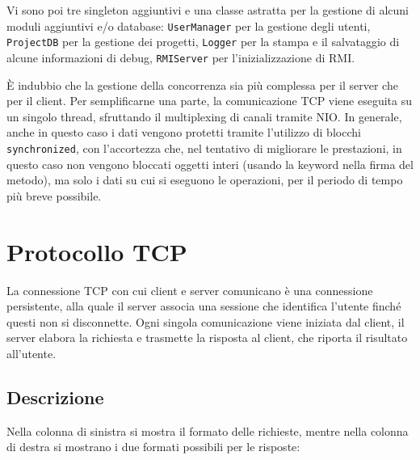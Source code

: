 \documentclass[a4paper,11pt] {article}
\begin{document}
Vi sono poi tre singleton aggiuntivi e una classe astratta per la gestione di alcuni moduli aggiuntivi e/o database: \texttt{UserManager} per la gestione degli utenti, \texttt{ProjectDB} per la gestione dei progetti, \texttt{Logger} per la stampa e il salvataggio di alcune informazioni di debug, \texttt{RMIServer} per l'inizializzazione di RMI.

È indubbio che la gestione della concorrenza sia più complessa per il server che per il client. Per semplificarne una parte, la comunicazione TCP viene eseguita su un singolo thread, sfruttando il multiplexing di canali tramite NIO. In generale, anche in questo caso i dati vengono protetti tramite l'utilizzo di blocchi \texttt{synchronized}, con l'accortezza che, nel tentativo di migliorare le prestazioni, in questo caso non vengono bloccati oggetti interi (usando la keyword nella firma del metodo), ma solo i dati su cui si eseguono le operazioni, per il periodo di tempo più breve possibile.

\section*{Protocollo TCP}

La connessione TCP con cui client e server comunicano è una connessione persistente, alla quale il server associa una sessione che identifica l'utente finché questi non si disconnette. Ogni singola comunicazione viene iniziata dal client, il server elabora la richiesta e trasmette la risposta al client, che riporta il risultato all'utente.

\subsection*{Descrizione}

Nella colonna di sinistra si mostra il formato delle richieste, mentre nella colonna di destra si mostrano i due formati possibili per le risposte:
\end{document}

